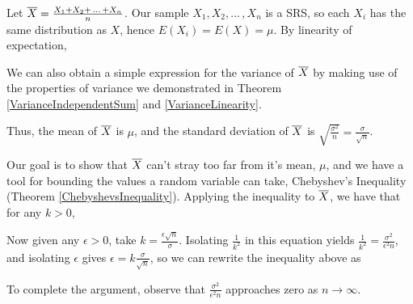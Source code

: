 \begin{pf} Let ${\overline{X}} = \frac{X_1+X_2+\,...\,+X_n}{n}$. Our sample $X_1, X_2, ... \,, X_n$ is a SRS, so each $X_i$ has the same distribution as $X$, hence $E(X_i) = E(X) = \mu$. By linearity of expectation,
\par
\noindent We can also obtain a simple expression for the variance of ${\overline{X}}$ by making use of the properties of variance we demonstrated in Theorem \ref{VarianceIndependentSum} and \ref{VarianceLinearity}.
\par
\noindent
Thus, the mean of ${\overline{X}}$ is $\mu$, and the standard deviation of ${\overline{X}}$ is $\sqrt{\frac{\sigma^2}{n}} = \frac{\sigma}{\sqrt{n}}$.
\par
\noindent Our goal is to show that ${\overline{X}}$ can't stray too far from it's mean, $\mu$, and we have a tool for bounding the values a random variable can take, Chebyshev's Inequality (Theorem \ref{ChebyshevsInequality}). Applying the inequality to ${\overline{X}}$, we have that for any $k > 0$,

\vspace{0.5em}
\par
\noindent Now given any $\epsilon > 0$, take $k = \frac{\epsilon\sqrt{n}}{\sigma}$. Isolating $\frac{1}{k^2}$ in this equation yields $\frac{1}{k^2} = \frac{\sigma^2}{\epsilon^2n}$, and isolating $\epsilon$ gives $\epsilon = k\frac{\sigma}{\sqrt{n}}$, so we can rewrite the inequality above as
\par
\noindent To complete the argument, observe that $\frac{\sigma^2}{\epsilon^2n}$ approaches zero as $n \to \infty$.
\end{pf}
